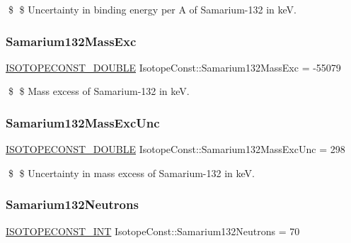 \$ \$ Uncertainty in binding energy per A of Samarium-\/132 in keV. \mbox{\label{group___isotope_const-_samarium-_sm132_ga83f7da2c78926fbc233164779448e21f}} 
\subsubsection{\texorpdfstring{Samarium132\+Mass\+Exc}{Samarium132MassExc}}
{\footnotesize\ttfamily \mbox{\hyperlink{group___isotope_const-_macros_ga8f45a7272ce02c0b4c65c44636ed719a}{I\+S\+O\+T\+O\+P\+E\+C\+O\+N\+S\+T\+\_\+\+D\+O\+U\+B\+LE}} Isotope\+Const\+::\+Samarium132\+Mass\+Exc = -\/55079}

\$ \$ Mass excess of Samarium-\/132 in keV. \mbox{\label{group___isotope_const-_samarium-_sm132_ga255c497bbed5fe0b66247ac2e16b05e4}} 
\subsubsection{\texorpdfstring{Samarium132\+Mass\+Exc\+Unc}{Samarium132MassExcUnc}}
{\footnotesize\ttfamily \mbox{\hyperlink{group___isotope_const-_macros_ga8f45a7272ce02c0b4c65c44636ed719a}{I\+S\+O\+T\+O\+P\+E\+C\+O\+N\+S\+T\+\_\+\+D\+O\+U\+B\+LE}} Isotope\+Const\+::\+Samarium132\+Mass\+Exc\+Unc = 298}

\$ \$ Uncertainty in mass excess of Samarium-\/132 in keV. \mbox{\label{group___isotope_const-_samarium-_sm132_ga8213eb027dea280e0e61b7b558524e3c}} 
\subsubsection{\texorpdfstring{Samarium132\+Neutrons}{Samarium132Neutrons}}
{\footnotesize\ttfamily \mbox{\hyperlink{group___isotope_const-_macros_ga5f18360b3e99483a35c32d789e62621c}{I\+S\+O\+T\+O\+P\+E\+C\+O\+N\+S\+T\+\_\+\+I\+NT}} Isotope\+Const\+::\+Samarium132\+Neutrons = 70}

